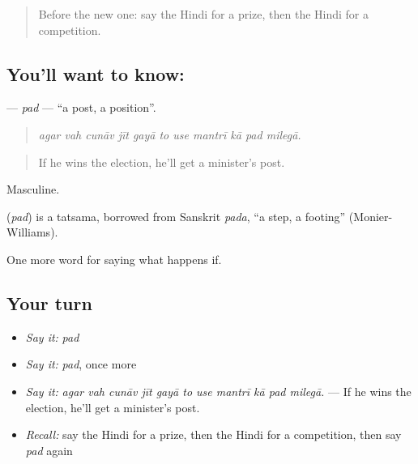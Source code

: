 \begin{quote}
Before the new one: say the Hindi for a prize, then the Hindi for a competition.
\end{quote}

\subsection*{You'll want to know: }
\textbf{} — \emph{pad} — \textquotedblleft{}a post, a position\textquotedblright{}.

\begin{quote}
          
\end{quote}

\begin{quote}
\emph{agar vah cunāv jīt gayā to use mantrī kā pad milegā.}
\end{quote}

\begin{quote}
If he wins the election, he'll get a minister's post.
\end{quote}

Masculine.

\begin{cousinweb}
\textbf{} (\emph{pad}) is a tatsama, borrowed from Sanskrit \emph{pada}, \textquotedblleft{}a step, a footing\textquotedblright{} (Monier-Williams).
\end{cousinweb}

\begin{grammarlens}[title={What you've built}]
One more word for saying what happens if.
\end{grammarlens}

\subsection*{Your turn}
\begin{itemize}
\raggedright
  \item \emph{Say it:} \emph{pad}
  \item \emph{Say it:} \emph{pad}, once more
  \item \emph{Say it:} \emph{agar vah cunāv jīt gayā to use mantrī kā pad milegā.} — If he wins the election, he'll get a minister's post.
  \item \emph{Recall:} say the Hindi for a prize, then the Hindi for a competition, then say \emph{pad} again
\end{itemize}

